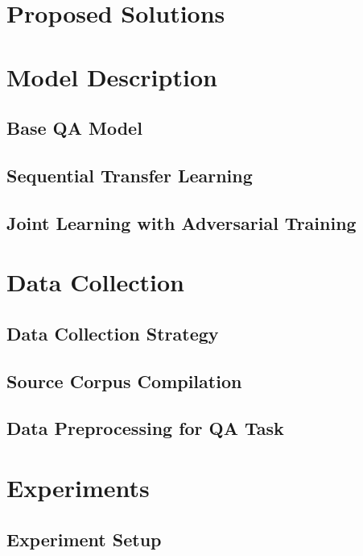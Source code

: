 \documentclass[]{article}
\begin{document}
\section{Proposed Solutions}



\section{Model Description}

\subsection{Base QA Model}

\subsection{Sequential Transfer Learning}

\subsection{Joint Learning with Adversarial Training}



\section{Data Collection}

\subsection{Data Collection Strategy}

\subsection{Source Corpus Compilation}

\subsection{Data Preprocessing for QA Task}



\section{Experiments}

\subsection{Experiment Setup}
\end{document}
